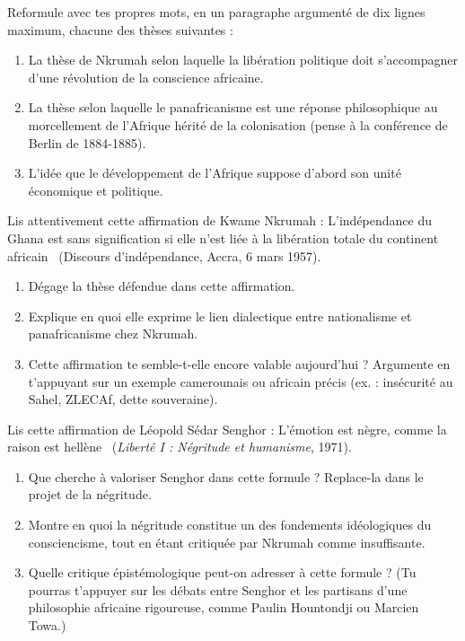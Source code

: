 \documentclass[11pt]{article}
\newcounter{popsec}
\newcounter{popsub}
\newcommand{\courssub}[1]{%
  \stepcounter{popsub}%
  \par\vspace{9pt}\noindent{\popxbold\fontsize{11.5}{13}\selectfont\color{popink}{\color{poporange}\thepopsec.\thepopsub}\hspace{6pt}#1}\par\nopagebreak\vspace{4pt}
}
\begin{document}
\courssub{Je m'entraîne}

\begin{exercice}
Reformule avec tes propres mots, en un paragraphe argumenté de dix lignes maximum, chacune des thèses suivantes :

\begin{enumerate}
\item La thèse de Nkrumah selon laquelle la libération politique doit s'accompagner d'une révolution de la conscience africaine.
\item La thèse selon laquelle le panafricanisme est une réponse philosophique au morcellement de l'Afrique hérité de la colonisation (pense à la conférence de Berlin de 1884-1885).
\item L'idée que le développement de l'Afrique suppose d'abord son unité économique et politique.
\end{enumerate}
\end{exercice}

\begin{exercice}
Lis attentivement cette affirmation de Kwame Nkrumah : \guillemotleft L'indépendance du Ghana est sans signification si elle n'est liée à la libération totale du continent africain \guillemotright\ (Discours d'indépendance, Accra, 6 mars 1957).

\begin{enumerate}
\item Dégage la thèse défendue dans cette affirmation.
\item Explique en quoi elle exprime le lien dialectique entre nationalisme et panafricanisme chez Nkrumah.
\item Cette affirmation te semble-t-elle encore valable aujourd'hui ? Argumente en t'appuyant sur un exemple camerounais ou africain précis (ex. : insécurité au Sahel, ZLECAf, dette souveraine).
\end{enumerate}
\end{exercice}

\begin{exercice}
Lis cette affirmation de Léopold Sédar Senghor : \guillemotleft L'émotion est nègre, comme la raison est hellène \guillemotright\ (\emph{Liberté I : Négritude et humanisme}, 1971).

\begin{enumerate}
\item Que cherche à valoriser Senghor dans cette formule ? Replace-la dans le projet de la négritude.
\item Montre en quoi la négritude constitue un des fondements idéologiques du consciencisme, tout en étant critiquée par Nkrumah comme insuffisante.
\item Quelle critique épistémologique peut-on adresser à cette formule ? (Tu pourras t'appuyer sur les débats entre Senghor et les partisans d'une philosophie africaine rigoureuse, comme Paulin Hountondji ou Marcien Towa.)
\end{enumerate}
\end{exercice}
\end{document}
